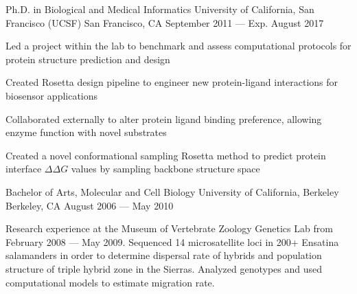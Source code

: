 

\begin{cventries}

  \cventry
  {Ph.D. in Biological and Medical Informatics} %
  {University of California, San Francisco (UCSF)} %
  {San Francisco, CA} %
  {September 2011 --- Exp. August 2017} %
  {
    \begin{cvitems} %
    \item Led a project within the lab to benchmark and assess computational protocols for protein structure prediction and design
    \item Created Rosetta design pipeline to
      engineer new protein-ligand interactions for biosensor applications
    \item Collaborated externally to alter protein ligand binding preference, allowing enzyme function with novel substrates
    \item Created a novel conformational sampling Rosetta method to predict protein interface $\Delta\Delta G$ values by sampling backbone structure space
    \end{cvitems}
  }

  \cventry
  {Bachelor of Arts, Molecular and Cell Biology} %
  {University of California, Berkeley} %
  {Berkeley, CA} %
  {August 2006 --- May 2010} %
  {
    \begin{cvitems} %
    \item Research experience at the Museum of Vertebrate Zoology Genetics Lab from February 2008 --- May 2009.
      Sequenced 14 microsatellite loci in 200+ Ensatina salamanders in order to determine dispersal rate of hybrids and population structure of triple hybrid zone in the Sierras. Analyzed genotypes and used computational models to estimate migration rate.
    \end{cvitems}
  }

\end{cventries}
